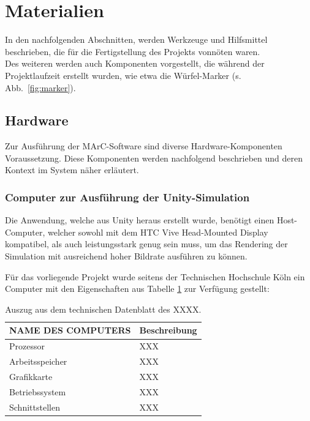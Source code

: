 \section{Materialien}\label{sec:Materialien}
In den nachfolgenden Abschnitten, werden Werkzeuge und Hilfsmittel beschrieben, die für die Fertigstellung des Projekts vonnöten waren.\\ Des weiteren werden auch Komponenten vorgestellt, die während der Projektlaufzeit erstellt wurden, wie etwa die Würfel-Marker (s. Abb.~\ref{fig:marker}).

\subsection{Hardware}
Zur Ausführung der MArC-Software sind diverse Hardware-Komponenten Voraussetzung. Diese Komponenten werden nachfolgend beschrieben und deren Kontext im System näher erläutert.
\subsubsection{Computer zur Ausführung der Unity-Simulation}\label{sec:UnityComp}
Die Anwendung, welche aus Unity \cite{website:Unity} heraus erstellt wurde, benötigt einen Host-Computer, welcher sowohl mit dem HTC Vive Head-Mounted Display kompatibel, als auch leistungsstark genug sein muss, um das Rendering der Simulation mit ausreichend hoher Bildrate ausführen zu können.

Für das vorliegende Projekt wurde seitens der Technischen Hochschule Köln ein Computer mit den  Eigenschaften aus Tabelle \ref{tab:UnityCompParam} zur Verfügung gestellt:


\begin{table}
	\centering
	\begin{tabular}{|l|l|}
		\hline
		\Absatzbox{}
		\textbf{NAME DES COMPUTERS}& \textbf{Beschreibung} \\
		\hline
		Prozessor & XXX \\
		\hline
		Arbeitsspeicher & XXX \\
		\hline 
		Grafikkarte & XXX\\
		\hline
		Betriebssystem &XXX \\
		\hline
		Schnittstellen & XXX \\
		\hline
	\end{tabular}
	\caption{Auszug aus dem technischen Datenblatt des XXXX.}
	\label{tab:UnityCompParam}
\end{table}


